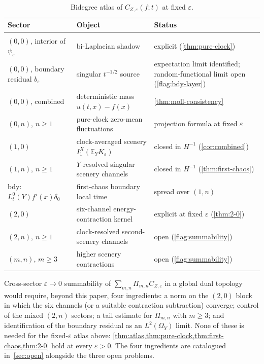 \documentclass[EJP]{ejpecp}
\renewcommand{\E}{\mathbb{E}}
\newcommand{\IBM}{Z}
\newcommand{\Pir}{\Pi}
\begin{document}
\begin{table}[h!]
\caption{Bidegree atlas of $C_{\IBM,\varepsilon}(f;t)$ at fixed
$\varepsilon$.}
\label{tab:atlas}
\footnotesize
\setlength{\tabcolsep}{4pt}
\begin{tabular}{@{}p{}p{}p{}@{}}
\textbf{Sector} & \textbf{Object} & \textbf{Status}\\[2pt]
\hline\\[-6pt]
$(0,0)$, interior of $\psi_\varepsilon$
 & bi-Laplacian shadow
 & explicit (\cref{thm:pure-clock})\\
$(0,0)$, boundary residual $b_\varepsilon$
 & singular $t^{-1/2}$ source
 & expectation limit identified; random-functional limit open (\cref{flag:bdy-layer})\\
$(0,0)$, combined
 & deterministic mass $u(t,x)-f(x)$
 & \cref{thm:moll-consistency}\\
$(0,n)$, $n\ge 1$
 & pure-clock zero-mean fluctuations
 & projection formula at fixed $\varepsilon$\\
$(1,0)$
 & clock-averaged scenery $I_1^X(\E_Y K_\varepsilon)$
 & closed in $H^{-1}$ (\cref{cor:combined})\\
$(1,n)$, $n\ge 1$
 & $Y$-resolved singular scenery channels
 & closed in $H^{-1}$ (\cref{thm:first-chaos})\\
bdy: $L_t^{0}(Y)f'(x)\delta_0$
 & first-chaos boundary local time
 & spread over $(1,n)$\\
$(2,0)$
 & six-channel energy-contraction kernel
 & explicit at fixed $\varepsilon$ (\cref{thm:2-0})\\
$(2,n)$, $n\ge 1$
 & clock-resolved second-scenery channels
 & open (\cref{flag:summability})\\
$(m,n)$, $m\ge 3$
 & higher scenery contractions
 & open (\cref{flag:summability})\\
\end{tabular}
\end{table}

Cross-sector $\varepsilon\to 0$ summability of
$\sum_{m,n}\Pir_{m,n}C_{\IBM,\varepsilon}$ in a global dual
topology would require, beyond this paper, four ingredients: a
norm on the $(2,0)$ block in which the six channels (or a suitable
contraction subtraction) converge; control of the mixed $(2,n)$
sectors; a tail estimate for $\Pir_{m,n}$ with $m\ge 3$; and
identification of the boundary residual as an $L^{2}(\Omega_Y)$
limit. None of these is needed for the fixed-$\varepsilon$ atlas
above: \cref{thm:atlas,thm:pure-clock,thm:first-chaos,thm:2-0} hold
at every $\varepsilon>0$. The four ingredients are catalogued
in~\cref{sec:open} alongside the three open problems.
\end{document}
